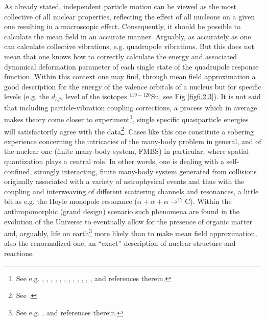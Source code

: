   
  As already stated, independent particle motion can be viewed as the most collective of all nuclear properties, reflecting the effect of all nucleons on a given one resulting in a macroscopic effect. Consequently, it should be possible to calculate the mean field in an accurate manner. Arguably, as accurately as one can calculate collective vibrations, e.g. quadrupole vibrations. But this does not mean that one knows how to correctly calculate the energy and associated dynamical deformation parameter of each single state of the quadrupole response function. Within this context one may find, through mean field approximation a good description for the energy of the valence orbitals of a nucleus but for  specific levels (e.g. the $d_{5/2}$ level of the isotopes $^{119-120}$Sn, see Fig \ref{fig6.2.3}). It is not said that  including  particle-vibration coupling corrections, a process which in average makes theory come closer to experiment\footnote{See e.g. \cite{Bohr:75}, \cite{Bohr:77}, \cite{Hamamoto:77}, \cite{Bes:77c}, \cite{Reich:74}, \cite{Hamamoto:76}, \cite{Bortignon:77}, \cite{Mahaux:85}, \cite{Bes:71,Flynn:71}, \cite{Bortignon:76}, \cite{Bes:88}, \cite{Barranco:87b}, \cite{Barranco:01,Orrigo:09} and references therein.}, single specific quasiparticle energies will satisfactorily agree  with the data\footnote{See \cite{Tarpanov:14}.}. Cases like this one constitute a sobering experience concerning the intricacies of the many-body problem in general, and of the nuclear one (finite many-body system, FMBS) in particular, where spatial quantization plays a central role. In other words, one is dealing with a self-confined, strongly interacting, finite many-body system generated from collisions originally associated  with a variety of astrophysical events and thus with  the coupling and interweaving of different scattering channels and resonances, a little bit as e.g. the Hoyle monopole resonance ($\alpha+\alpha+\alpha\rightarrow^{12}$C). Within the anthropomorphic (grand design) scenario such phenomena are found in the evolution of the Universe to eventually allow for the presence of organic matter and, arguably, life on earth\footnote{See e.g. \cite{Rees:00}, \cite{Meissner:15} and references therein.} more likely than to make mean field approximation, also the renormalized one, an ``exact'' description of nuclear structure and reactions.
 
 
